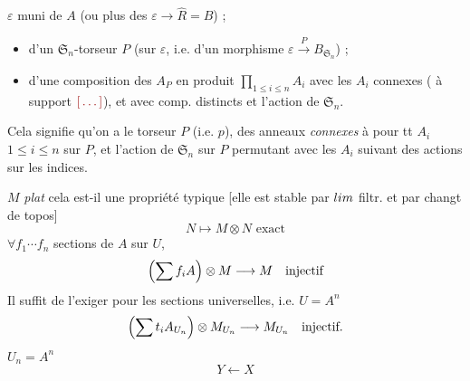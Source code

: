 \documentclass[11pt,a4paper]{article}
\begin{document}
$\varepsilon$ muni de $A$ \ill{} \ill{} (ou plus des $\varepsilon \to
\hat{R} = B$) ;
\begin{itemize}
  \item[a)] d'un $\mathfrak{S}_{n}$-torseur $P$ (sur $\varepsilon$, i.e.
    d'un morphisme $\varepsilon \xrightarrow{\ P\ } B_{\mathfrak{S}_{n}}$) ;
  \item[b)] d'une \struck{\ill{}}composition des $A_{P}$ en produit
    $\prod_{1 \leqslant i \leqslant n} A_{i}$ avec les $A_{i}$ connexes
    (\ill{} à support $\ill{}$), et avec comp. distincts \ill{} \ill{} et
    l'action de $\mathfrak{S}_{n}$.
\end{itemize}
Cela signifie qu'on a \ill{} le torseur $P$ (i.e. $p$), des anneaux
\emph{connexes} \ill{} à \ill{} \ill{} pour tt $A_{i}$ $1 \leqslant i \leqslant n$ sur $P$,
et \struck{\ill{}} l'action de $\mathfrak{S}_{n}$ sur $P$ permutant \ill{} avec les
$A_{i}$ \ill{} suivant des actions \ill{} sur les indices.



$M$ \emph{plat} cela est-il une propriété typique [elle est stable par
$\varinjlim$ filtr. et par changt de topos]
\[
  N \mapsto M \otimes N \text{ exact}
\]
$\forall f_{1} \cdots f_{n}$ sections de $A$ sur $U$,
\[
  \Bigl(\sum f_{i} A\Bigr) \otimes M \longrightarrow M \quad \text{injectif}
\]
Il suffit de l'exiger pour les  sections
universelles, i.e. $U = A^{n}$
\[
  \Bigl(\sum t_{i} A_{U_{n}}\Bigr) \otimes M_{U_{n}} \longrightarrow
  M_{U_{n}} \quad \text{injectif.}
\]
$U_{n} = A^{n}$
\[
  Y \longleftarrow X
\]

\end{document}
